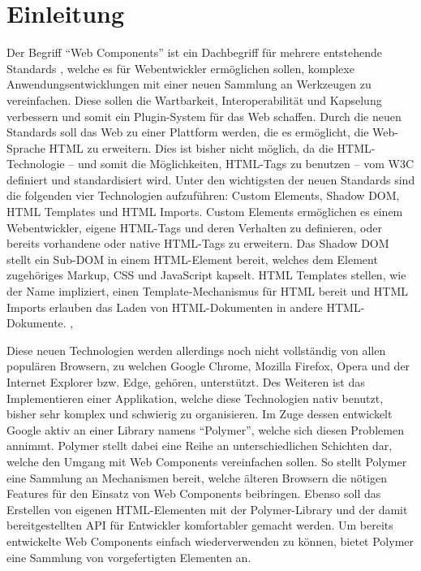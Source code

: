 \chapter{Einleitung}\label{einleitung}

Der Begriff ``Web Components'' ist ein Dachbegriff für mehrere entstehende Standards \cite{citeulike:13844988}, welche es für Webentwickler ermöglichen sollen, komplexe Anwendungsentwicklungen mit einer neuen Sammlung an Werkzeugen zu vereinfachen. Diese sollen die Wartbarkeit, Interoperabilität und Kapselung verbessern und somit ein Plugin-System für das Web schaffen. Durch die neuen Standards soll das Web zu einer Plattform werden, die es ermöglicht, die Web-Sprache \ac{HTML} zu erweitern. Dies ist bisher nicht möglich, da die \ac{HTML}-Technologie -- und somit die Möglichkeiten, \ac{HTML}-Tags zu benutzen -- vom \ac{W3C} definiert und standardisiert wird. Unter den wichtigsten der neuen Standards sind die folgenden vier Technologien aufzuführen: Custom Elements, Shadow \ac{DOM}, \ac{HTML} Templates und \ac{HTML} Imports. Custom Elements ermöglichen es einem Webentwickler, eigene \ac{HTML}-Tags und deren Verhalten zu definieren, oder bereits vorhandene oder native \ac{HTML}-Tags zu erweitern. Das Shadow \ac{DOM} stellt ein Sub-\ac{DOM} in einem \ac{HTML}-Element bereit, welches dem Element zugehöriges Markup, \ac{CSS} und JavaScript kapselt. \ac{HTML} Templates stellen, wie der Name impliziert, einen Template-Mechanismus für \ac{HTML} bereit und \ac{HTML} Imports erlauben das Laden von \ac{HTML}-Dokumenten in andere \ac{HTML}-Dokumente. \cite{citeulike:13842702}, \cite{citeulike:13842701}

Diese neuen Technologien werden allerdings noch nicht vollständig von allen populären Browsern, zu welchen Google Chrome, Mozilla Firefox, Opera und der Internet Explorer bzw. Edge, gehören, unterstützt. Des Weiteren ist das Implementieren einer Applikation, welche diese Technologien nativ benutzt, bisher sehr komplex und schwierig zu organisieren. Im Zuge dessen entwickelt Google aktiv an einer Library namens ``Polymer'', welche sich diesen Problemen annimmt. Polymer stellt dabei eine Reihe an unterschiedlichen Schichten dar, welche den Umgang mit Web Components vereinfachen sollen. So stellt Polymer eine Sammlung an Mechanismen bereit, welche älteren Browsern die nötigen Features für den Einsatz von Web Components beibringen. Ebenso soll das Erstellen von eigenen \ac{HTML}-Elementen mit der Polymer-Library und der damit bereitgestellten \ac{API} für Entwickler komfortabler gemacht werden. Um bereits entwickelte Web Components einfach wiederverwenden zu können, bietet Polymer eine Sammlung von vorgefertigten Elementen an.

